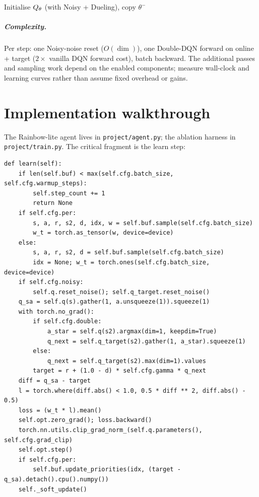 \documentclass[11pt,oneside]{scrbook}
\begin{document}
\begin{algorithm}[H]
\caption{Rainbow-lite (Double + Dueling + PER + Noisy)}
Initialise $Q_\theta$ (with Noisy + Dueling), copy $\theta^-$\;
\end{algorithm}

\paragraph{Complexity.} Per step: one Noisy-noise reset ($O(\dim)$), one Double-DQN
forward on online + target ($2\times$ vanilla DQN forward cost), batch backward.
The additional passes and sampling work depend on the enabled components;
measure wall-clock and learning curves rather than assume fixed overhead or gains.

\chapter{Implementation walkthrough}

The Rainbow-lite agent lives in \texttt{project/agent.py}; the ablation harness in
\texttt{project/train.py}. The critical fragment is the learn step:

\begin{verbatim}
def learn(self):
    if len(self.buf) < max(self.cfg.batch_size, self.cfg.warmup_steps):
        self.step_count += 1
        return None
    if self.cfg.per:
        s, a, r, s2, d, idx, w = self.buf.sample(self.cfg.batch_size)
        w_t = torch.as_tensor(w, device=device)
    else:
        s, a, r, s2, d = self.buf.sample(self.cfg.batch_size)
        idx = None; w_t = torch.ones(self.cfg.batch_size, device=device)
    if self.cfg.noisy:
        self.q.reset_noise(); self.q_target.reset_noise()
    q_sa = self.q(s).gather(1, a.unsqueeze(1)).squeeze(1)
    with torch.no_grad():
        if self.cfg.double:
            a_star = self.q(s2).argmax(dim=1, keepdim=True)
            q_next = self.q_target(s2).gather(1, a_star).squeeze(1)
        else:
            q_next = self.q_target(s2).max(dim=1).values
        target = r + (1.0 - d) * self.cfg.gamma * q_next
    diff = q_sa - target
    l = torch.where(diff.abs() < 1.0, 0.5 * diff ** 2, diff.abs() - 0.5)
    loss = (w_t * l).mean()
    self.opt.zero_grad(); loss.backward()
    torch.nn.utils.clip_grad_norm_(self.q.parameters(), self.cfg.grad_clip)
    self.opt.step()
    if self.cfg.per:
        self.buf.update_priorities(idx, (target - q_sa).detach().cpu().numpy())
    self._soft_update()
\end{verbatim}
\end{document}
